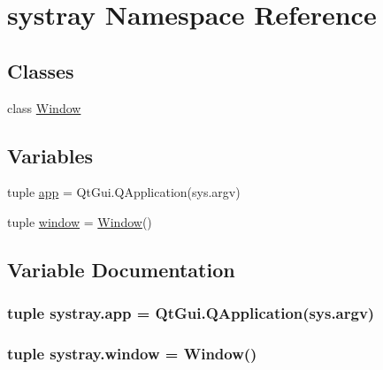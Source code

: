 \hypertarget{namespacesystray}{}\section{systray Namespace Reference}
\label{namespacesystray}
\subsection*{Classes}
\begin{DoxyCompactItemize}
\item 
class \hyperlink{classsystray_1_1Window}{Window}
\end{DoxyCompactItemize}
\subsection*{Variables}
\begin{DoxyCompactItemize}
\item 
tuple \hyperlink{namespacesystray_a27b14eee6af54b7bace57b5bed2beb6a}{app} = Qt\+Gui.\+Q\+Application(sys.\+argv)
\item 
tuple \hyperlink{namespacesystray_aef99f74a6c32c3f49d665d7138287d3a}{window} = \hyperlink{classsystray_1_1Window}{Window}()
\end{DoxyCompactItemize}


\subsection{Variable Documentation}
\hypertarget{namespacesystray_a27b14eee6af54b7bace57b5bed2beb6a}{}
\subsubsection[{app}]{\setlength{\rightskip}{0pt plus 5cm}tuple systray.\+app = Qt\+Gui.\+Q\+Application(sys.\+argv)}\label{namespacesystray_a27b14eee6af54b7bace57b5bed2beb6a}
\hypertarget{namespacesystray_aef99f74a6c32c3f49d665d7138287d3a}{}
\subsubsection[{window}]{\setlength{\rightskip}{0pt plus 5cm}tuple systray.\+window = {\bf Window}()}\label{namespacesystray_aef99f74a6c32c3f49d665d7138287d3a}
